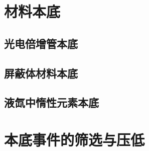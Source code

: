 \section{材料本底}

\subsection{光电倍增管本底}
\label{sec:pmt_background}

\subsection{屏蔽体材料本底}

\subsection{液氙中惰性元素本底}

\section{本底事件的筛选与压低}
